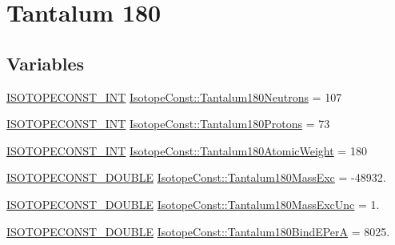\hypertarget{group___isotope_const-_tantalum-_ta180}{}\section{Tantalum 180}
\label{group___isotope_const-_tantalum-_ta180}
\subsection*{Variables}
\begin{DoxyCompactItemize}
\item 
\mbox{\hyperlink{group___isotope_const-_macros_ga5f18360b3e99483a35c32d789e62621c}{I\+S\+O\+T\+O\+P\+E\+C\+O\+N\+S\+T\+\_\+\+I\+NT}} \mbox{\hyperlink{group___isotope_const-_tantalum-_ta180_ga5e7df01f95c5e35719d1a4222a853c98}{Isotope\+Const\+::\+Tantalum180\+Neutrons}} = 107
\item 
\mbox{\hyperlink{group___isotope_const-_macros_ga5f18360b3e99483a35c32d789e62621c}{I\+S\+O\+T\+O\+P\+E\+C\+O\+N\+S\+T\+\_\+\+I\+NT}} \mbox{\hyperlink{group___isotope_const-_tantalum-_ta180_gaa34a06dfb03d4a7668182b73462202e7}{Isotope\+Const\+::\+Tantalum180\+Protons}} = 73
\item 
\mbox{\hyperlink{group___isotope_const-_macros_ga5f18360b3e99483a35c32d789e62621c}{I\+S\+O\+T\+O\+P\+E\+C\+O\+N\+S\+T\+\_\+\+I\+NT}} \mbox{\hyperlink{group___isotope_const-_tantalum-_ta180_gad64d9a3e17a1df04673b73d1355d50a8}{Isotope\+Const\+::\+Tantalum180\+Atomic\+Weight}} = 180
\item 
\mbox{\hyperlink{group___isotope_const-_macros_ga8f45a7272ce02c0b4c65c44636ed719a}{I\+S\+O\+T\+O\+P\+E\+C\+O\+N\+S\+T\+\_\+\+D\+O\+U\+B\+LE}} \mbox{\hyperlink{group___isotope_const-_tantalum-_ta180_gab57c84b597c115a8e64bcfccd1bd3aa3}{Isotope\+Const\+::\+Tantalum180\+Mass\+Exc}} = -\/48932.
\item 
\mbox{\hyperlink{group___isotope_const-_macros_ga8f45a7272ce02c0b4c65c44636ed719a}{I\+S\+O\+T\+O\+P\+E\+C\+O\+N\+S\+T\+\_\+\+D\+O\+U\+B\+LE}} \mbox{\hyperlink{group___isotope_const-_tantalum-_ta180_ga0355e86660de7e5ef1f5ca3a1d962019}{Isotope\+Const\+::\+Tantalum180\+Mass\+Exc\+Unc}} = 1.
\item 
\mbox{\hyperlink{group___isotope_const-_macros_ga8f45a7272ce02c0b4c65c44636ed719a}{I\+S\+O\+T\+O\+P\+E\+C\+O\+N\+S\+T\+\_\+\+D\+O\+U\+B\+LE}} \mbox{\hyperlink{group___isotope_const-_tantalum-_ta180_gaa6c5805c6fe2347aa289ca2d3da4fb55}{Isotope\+Const\+::\+Tantalum180\+Bind\+E\+PerA}} = 8025.
\item 

\end{DoxyCompactItemize}
